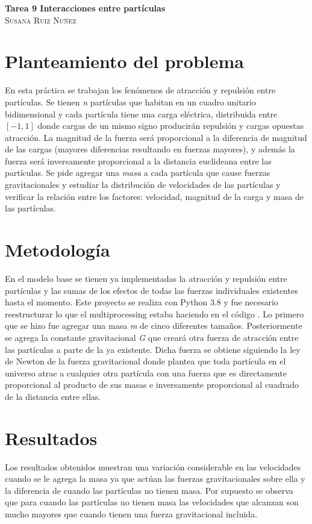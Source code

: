 \documentclass{article}
\begin{document}
	\begin{center}
	\huge{\textbf{Tarea 9 Interacciones entre partículas}}\\
	
	\textsc{ \Large Susana Ruiz Nuñez}
	\end{center}


\section{Planteamiento del problema} 
En esta práctica \cite{satu} se trabajan los fenómenos de atracción y repulsión entre partículas. Se tienen \textit{n} partículas que habitan en un cuadro unitario bidimensional y cada partícula tiene una carga eléctrica, distribuida entre $[-1,1]$ donde cargas de un mismo signo producirán repulsión y cargas opuestas atracción. La magnitud de la fuerza será proporcional a la diferencia de magnitud de las cargas (mayores diferencias resultando en fuerzas mayores), y además la fuerza será inversamente proporcional a la distancia euclideana entre las partículas. Se pide agregar una \textit{masa} a cada partícula que cause fuerzas gravitacionales y estudiar la distribución de velocidades de las partículas
y verificar la relación entre los factores: velocidad, magnitud de la carga y masa de las partículas.

\section{Metodología}
En el modelo base \cite{satu} se tienen ya implementadas la atracción y repulsión entre partículas y las sumas de los efectos de todas las fuerzas individuales existentes hasta el momento. Este proyecto se realiza con Python 3.8 y fue necesario reestructurar lo que el multiprocessing estaba haciendo en el código \cite{vict}. Lo primero que se hizo fue agregar una masa \textit{m} de cinco diferentes tamaños. Posteriormente se agrega la constante gravitacional \textit{G} que creará otra fuerza de atracción entre las partículas a parte de la ya existente. Dicha fuerza se obtiene siguiendo la ley de Newton de la fuerza gravitacional donde plantea que toda partícula en el universo atrae a cualquier otra partícula con una fuerza que es directamente proporcional al producto de sus masas e inversamente proporcional al cuadrado de la distancia entre ellas.


\section{Resultados}
Los resultados obtenidos muestran una variación considerable en las velocidades cuando se le agrega la masa ya que actúan las fuerzas gravitacionales sobre ella y la diferencia de cuando las partículas no tienen masa. Por supuesto se observa que para cuando las partículas no tienen masa las velocidades que alcanzan son mucho mayores que cuando tienen una fuerza gravitacional incluida.
\end{document}
